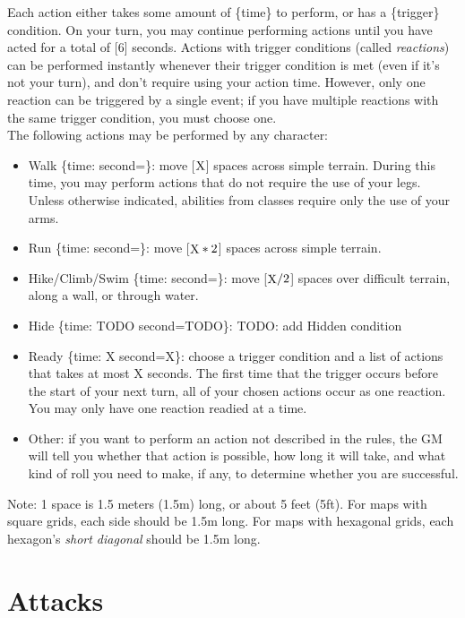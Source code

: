 \documentclass[12pt]{article}
\newcommand{\X}{\text{{\lower 0.2mm \hbox{X}}}}
\newcommand{\TIME}[1]{\{time: #1 second\if1=#1{}\else{s}\fi\}}
\begin{document}
Each action either takes some amount of \{time\} to perform, or has a \{trigger\} condition. On your turn, you may continue performing actions until you have acted for a total of [6] seconds. Actions with trigger conditions (called \textit{reactions}) can be performed instantly whenever their trigger condition is met (even if it’s not your turn), and don’t require using your action time. However, only one reaction can be triggered by a single event; if you have multiple reactions with the same trigger condition, you must choose one.
\\[5mm]
The following actions may be performed by any character:
\begin{itemize}

\item Walk \TIME{\X}: move [$\X$] spaces across simple terrain. During this time, you may perform actions that do not require the use of your legs. Unless otherwise indicated, abilities from classes require only the use of your arms.

\item Run \TIME{\X}: move [$\X * 2$] spaces across simple terrain.

\item Hike/Climb/Swim \TIME{\X}: move [$\X / 2$] spaces over difficult terrain, along a wall, or through water.

\item Hide \TIME{TODO}: TODO: add Hidden condition

\item Ready \TIME{X}: choose a trigger condition and a list of actions that takes at most X seconds. The first time that the trigger occurs before the start of your next turn, all of your chosen actions occur as one reaction. You may only have one reaction readied at a time.

\item Other: if you want to perform an action not described in the rules, the GM will tell you whether that action is possible, how long it will take, and what kind of roll you need to make, if any, to determine whether you are successful.

\end{itemize}

Note: 1 space is 1.5 meters (1.5m) long, or about 5 feet (5ft). For maps with square grids, each side should be 1.5m long. For maps with hexagonal grids, each hexagon’s \textit{short diagonal} should be 1.5m long.

\pagebreak
\section{Attacks}
\end{document}

